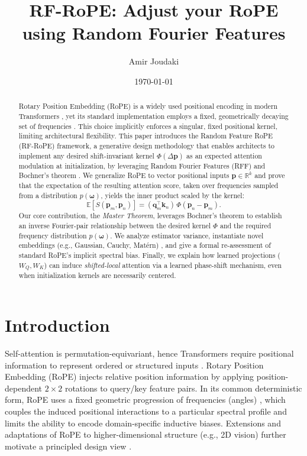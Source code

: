 \documentclass{article}
\title{RF-RoPE: Adjust your RoPE using Random Fourier Features}
\author{Amir Joudaki}
\date{\today}
\theoremstyle{plain}
\theoremstyle{remark}
\begin{document}
\maketitle

\begin{abstract}
Rotary Position Embedding (RoPE) is a widely used positional encoding in modern Transformers \cite{su2021roformer,touvron2023llama}, yet its standard implementation employs a fixed, geometrically decaying set of frequencies \cite{su2021roformer}. This choice implicitly enforces a singular, fixed positional kernel, limiting architectural flexibility. This paper introduces the Random Feature RoPE (RF-RoPE) framework, a generative design methodology that enables architects to implement any desired shift-invariant kernel $\Phi(\Delta \mathbf{p})$ as an expected attention modulation at initialization, by leveraging Random Fourier Features (RFF) \cite{rahimi2007random} and Bochner's theorem \cite{bochner1955harmonic,rasmussen2006gpml}. We generalize RoPE to vector positional inputs $\mathbf{p} \in \mathbb{R}^k$ and prove that the expectation of the resulting attention score, taken over frequencies sampled from a distribution $p(\boldsymbol{\omega})$, yields the inner product scaled by the kernel:
\[
\mathbb{E}[S(\mathbf{p}_m,\mathbf{p}_n)] = (\mathbf{q}_m^\top \mathbf{k}_n)\,\Phi(\mathbf{p}_n-\mathbf{p}_m).
\]
Our core contribution, the \emph{Master Theorem}, leverages Bochner's theorem to establish an inverse Fourier-pair relationship between the desired kernel $\Phi$ and the required frequency distribution $p(\boldsymbol{\omega})$. We analyze estimator variance, instantiate novel embeddings (e.g., Gaussian, Cauchy, Mat\'ern) \cite{rasmussen2006gpml,matern1960spatial}, and give a formal re-assessment of standard RoPE's implicit spectral bias. Finally, we explain how learned projections ($W_Q,W_K$) can induce \emph{shifted-local} attention via a learned phase-shift mechanism, even when initialization kernels are necessarily centered.
\end{abstract}

\section{Introduction}
Self-attention is permutation-equivariant, hence Transformers require positional information to represent ordered or structured inputs \cite{vaswani2017attention}. Rotary Position Embedding (RoPE) \cite{su2021roformer} injects relative position information by applying position-dependent $2\times 2$ rotations to query/key feature pairs. In its common deterministic form, RoPE uses a fixed geometric progression of frequencies (angles) \cite{su2021roformer}, which couples the induced positional interactions to a particular spectral profile and limits the ability to encode domain-specific inductive biases. Extensions and adaptations of RoPE to higher-dimensional structure (e.g., 2D vision) further motivate a principled design view \cite{li2021learnablefourier,heo2024ropevit}.
\end{document}
